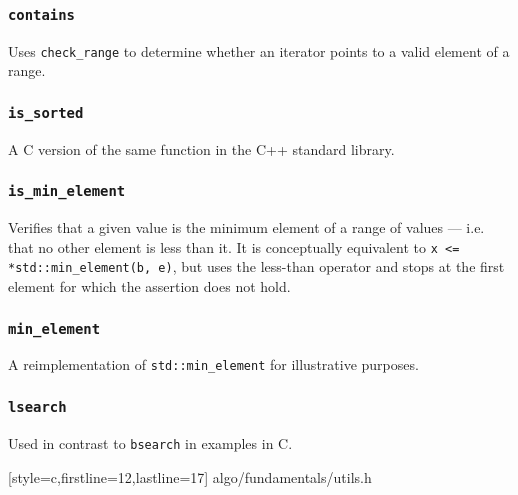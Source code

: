 \subsubsection{\texttt{contains}}

Uses \texttt{check\_range} to determine whether an iterator points to a valid
element of a range.


\vspace{-\baselineskip}

\subsubsection{\texttt{is\_sorted}}

A C version of the same function in the C++ standard library.


\vspace{-\baselineskip}

\subsubsection{\texttt{is\_min\_element}}

Verifies that a given value is the minimum element of a range of values --- i.e.
that no other element is less than it.  It is conceptually equivalent to
\texttt{x <= *std::min\_element(b, e)}, but uses the less-than operator and
stops at the first element for which the assertion does not hold.


\vspace{-\baselineskip}

\subsubsection{\texttt{min\_element}}

A reimplementation of \texttt{std::min\_element} for illustrative purposes.


\vspace{-\baselineskip}

\subsubsection{\texttt{lsearch}}

Used in contrast to \texttt{bsearch} in examples in C.


    [style=c,firstline=12,lastline=17]
    {algo/fundamentals/utils.h}
\vspace{-\baselineskip}
